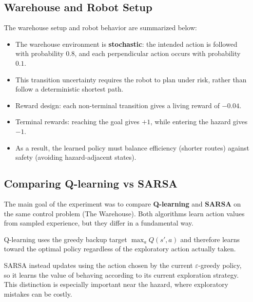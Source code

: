 \documentclass[10pt,twocolumn]{article}
\begin{document}
\subsection{Warehouse and Robot Setup}
The warehouse setup and robot behavior are summarized below:
\begin{itemize}
	\item The warehouse environment is \textbf{stochastic}: the intended action is followed with probability $0.8$, and each perpendicular action occurs with probability $0.1$.
	\item This transition uncertainty requires the robot to plan under risk, rather than follow a deterministic shortest path.
	\item Reward design: each non-terminal transition gives a living reward of $-0.04$.
	\item Terminal rewards: reaching the goal gives $+1$, while entering the hazard gives $-1$.
	\item As a result, the learned policy must balance efficiency (shorter routes) against safety (avoiding hazard-adjacent states).
\end{itemize}

\subsection{Comparing Q-learning vs SARSA}
The main goal of the experiment was to compare \textbf{Q-learning} and \textbf{SARSA} on the same control problem (The Warehouse). Both algorithms learn action values from sampled experience, but they differ in a fundamental way. 

Q-learning uses the greedy backup target $\max_a Q(s', a)$ and therefore learns toward the optimal policy regardless of the exploratory action actually taken. 

SARSA instead updates using the action chosen by the current $\varepsilon$-greedy policy, so it learns the value of behaving according to its current exploration strategy. This distinction is especially important near the hazard, where exploratory mistakes can be costly.
\end{document}
